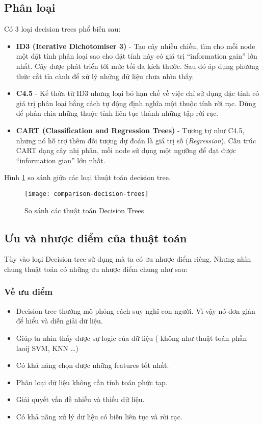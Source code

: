 \documentclass[../main-report.tex]{subfiles}
\begin{document}
\subsection{Phân loại}
Có 3 loại decision trees phổ biến sau:

\begin{itemize}
\item \textbf{ID3 (Iterative Dichotomiser 3)} - Tạo cây nhiều chiều, tìm cho mỗi node một đặt tính phân loại sao cho đặt tính này có giá trị ``information gain'' lớn nhất. Cây được phát triển tới mức tối đa kích thước. Sau đó áp dụng phương thức cắt tỉa cành để xử lý những dữ liệu chưa nhìn thấy.
\item \textbf{C4.5} - Kế thừa từ  ID3 nhưng loại bỏ hạn chế về việc chỉ sử dụng đặc tính có giá trị phân loại bằng cách tự động định nghĩa một thuộc tính rời rạc. Dùng để phân chia những thuộc tính liên tục thành những tập rời rạc.
\item \textbf{CART (Classification and Regression Trees)} - Tương tự như C4.5, nhưng nó hỗ trợ thêm đối tượng dự đoán là giá trị số (\textit{Regression}). Cấu trúc CART dạng cây nhị phân, mỗi node sử dụng một ngưỡng để đạt được ``information gian'' lớn nhất.
\end{itemize}

Hình \ref{fig:decision_tree_type_comparison} so sánh giữa các loại thuật toán decision tree.

\begin{figure}[ht!]
\centering\texttt{[image: comparison-decision-trees]}
\caption{So sánh các thuật toán Decision Trees}
\label{fig:decision_tree_type_comparison}
\end{figure}

\subsection{Ưu và nhược điểm của thuật toán}
Tùy vào loại Decision tree sử dụng mà ta có ưu nhược điểm riêng. Nhưng nhìn chung thuật toán có những ưu nhược điểm chung như sau:
\subsubsection*{Về ưu điểm}
\begin{itemize}
\item Decision tree thường mô phỏng cách suy nghĩ con người. Vì vậy nó đơn giản để hiểu và diễn giải dữ liệu.
\item Giúp ta nhìn thấy được sự logic của dữ liệu ( không như thuật toán phần laoij SVM, KNN …)
\item Có khả năng chọn được những features tốt nhất.
\item Phân loại dữ liệu không cần tính toán phức tạp.
\item Giải quyết vấn đề nhiễu và thiếu dữ liệu.
\item Có khả năng xử lý dữ liệu có biến liên tục và rời rạc.
\end{itemize}
\end{document}
